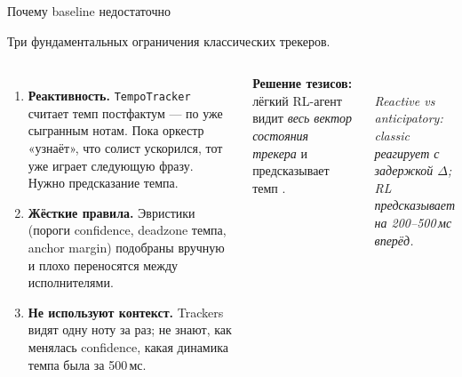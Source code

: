 ﻿%
\begin{frame}{Почему baseline недостаточно}
  \scriptsize

  Три фундаментальных ограничения классических трекеров.

  \begin{columns}[T,onlytextwidth]
    \begin{enumerate}\setlength{\itemsep}{0.4em}
      \item \textbf{Реактивность.} \texttt{TempoTracker} считает темп
            постфактум --- по уже сыгранным нотам. Пока оркестр
            «узнаёт», что солист ускорился, тот уже играет следующую
            фразу. Нужно  предсказание темпа.
      \item \textbf{Жёсткие правила.} Эвристики (пороги confidence,
            deadzone темпа, anchor margin) подобраны вручную и
            плохо переносятся между исполнителями.
      \item \textbf{Не используют контекст.} Trackers видят одну
            ноту за раз; не знают, как менялась confidence,
            какая динамика темпа была за 500\,мс.
    \end{enumerate}

    \vspace{0.3em}
    \textbf{Решение тезисов:} лёгкий RL-агент видит \emph{весь
    вектор состояния трекера} и предсказывает темп
    .

    \centering
    \resizebox{0.95\linewidth}{!}{%
    }\\[0.4em]
    {\scriptsize\itshape\color{black!70}
     Reactive vs anticipatory:\\
     classic реагирует с задержкой $\Delta$;\\
     RL предсказывает на 200--500\,мс вперёд.}
  \end{columns}
\end{frame}
